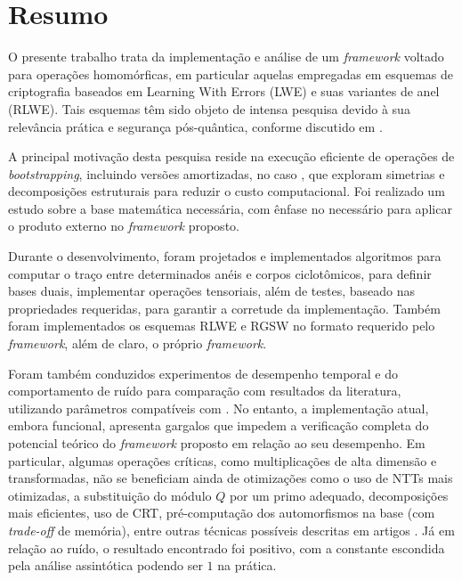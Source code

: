 \section{Resumo}

O presente trabalho trata da implementação e análise de um \textit{framework} voltado para operações homomórficas, em particular aquelas empregadas em esquemas de criptografia baseados em Learning With Errors (LWE) e suas variantes de anel (RLWE). Tais esquemas têm sido objeto de intensa pesquisa devido à sua relevância prática e segurança pós-quântica, conforme discutido em \cite{bgv12, gsw13, cggi16, lw23I}. 

A principal motivação desta pesquisa reside na execução eficiente de operações de \textit{bootstrapping}, incluindo versões amortizadas, no caso \cite{lw23I}, que exploram simetrias e decomposições estruturais para reduzir o custo computacional. Foi realizado um estudo sobre a base matemática necessária, com ênfase no necessário para aplicar o produto externo no \textit{framework} proposto.

Durante o desenvolvimento, foram projetados e implementados algoritmos para computar o traço entre determinados anéis e corpos ciclotômicos, para definir bases duais, implementar operações tensoriais, 
além de testes, baseado nas propriedades requeridas, para garantir a corretude da implementação. Também foram implementados os esquemas RLWE e RGSW no formato requerido pelo \textit{framework}, além de claro, o próprio \textit{framework}.

Foram também conduzidos experimentos de desempenho temporal e do comportamento de ruído para comparação com resultados da literatura, utilizando parâmetros compatíveis com \cite{lw23I, Guimaraes2023Amortized}. No entanto, a implementação atual, embora funcional, apresenta gargalos que impedem a verificação completa do potencial teórico do \textit{framework} proposto em relação ao seu desempenho. Em particular, algumas operações críticas, como multiplicações de alta dimensão e transformadas, não se beneficiam ainda de otimizações como o uso de NTTs mais otimizadas, a substituição do módulo $Q$ por um primo adequado, decomposições mais eficientes, uso de CRT, pré-computação dos automorfismos na base (com \textit{trade-off} de memória), entre outras técnicas possíveis descritas em artigos \cite{lw23II, lyubashevsky2013}. Já em relação ao ruído, o resultado encontrado foi positivo, com a constante escondida pela análise assintótica podendo ser $1$ na prática. 


